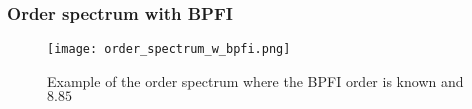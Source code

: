 \begin{frame}
    \frametitle{Order spectrum with BPFI}
    \small
    
    \begin{figure}
        \centering
        \texttt{[image: order\_spectrum\_w\_bpfi.png]}
        \caption{Example of the order spectrum where the BPFI order is known and $8.85$}
        \label{fig:order_spectrum}
    \end{figure}
   
\end{frame}
